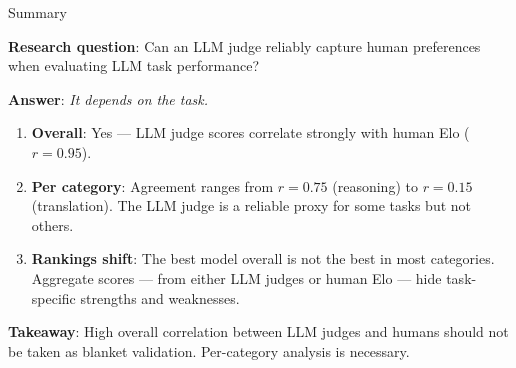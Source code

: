 \documentclass[aspectratio=169,11pt]{beamer}
\begin{document}
\begin{frame}{Summary}

\textbf{Research question}: Can an LLM judge reliably capture human preferences when evaluating LLM task performance?

\vspace{0.5em}
\textbf{Answer}: \textit{It depends on the task.}

\vspace{0.5em}
\begin{enumerate}
    \item \textbf{Overall}: Yes --- LLM judge scores correlate strongly with human Elo ($r = 0.95$).

    \vspace{0.3em}
    \item \textbf{Per category}: Agreement ranges from $r = 0.75$ (reasoning) to $r = 0.15$ (translation). The LLM judge is a reliable proxy for some tasks but not others.

    \vspace{0.3em}
    \item \textbf{Rankings shift}: The best model overall is not the best in most categories. Aggregate scores --- from either LLM judges or human Elo --- hide task-specific strengths and weaknesses.
\end{enumerate}

\vspace{0.5em}
\textbf{Takeaway}: High overall correlation between LLM judges and humans should not be taken as blanket validation. Per-category analysis is necessary.
\end{frame}
\end{document}
